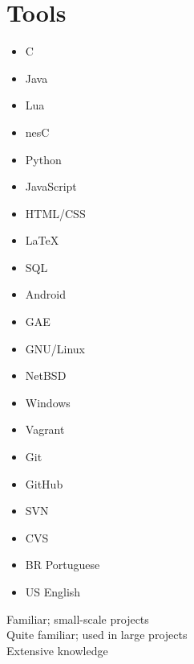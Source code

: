 \documentclass[a4paper,10pt]{article}
\begin{document}
\section{Tools}

\begin{multicols}{3}
  \begin{itemize}
    \renewcommand{\labelitemi}{\textcolor{lightg}{\symbol{"00BB}}}
    \setlength{\itemsep}{1pt}
    \setlength{\parskip}{0pt}
    \setlength{\parsep}{0pt}
  \item C \hfill \threenotes 
  \item Java \hfill \threenotes
  \item Lua \hfill \threenotes
  \item nesC \hfill \onenote
  \item Python \hfill \twonotes
  \item JavaScript \hfill \twonotes
  \item HTML/CSS \hfill \twonotes
  \item \LaTeX \hfill \twonotes
  \item SQL \hfill \twonotes
  \item Android \hfill \twonotes
  \item GAE \hfill \twonotes
  \item GNU/Linux \hfill \threenotes
  \item NetBSD \hfill \twonotes
  \item Windows \hfill \onenote
  \item Vagrant \hfill \twonotes
  \item Git \hfill \twonotes
  \item GitHub \hfill \twonotes
  \item SVN \hfill \onenote
  \item CVS \hfill \onenote
  \item BR Portuguese \hfill \twonotes
  \item US English \hfill \twonotes
  \end{itemize} 
\end{multicols}

\vspace{1em}

\begin{center}
\parbox[c]{8cm}{
  \onenote Familiar; small-scale projects \\
  \twonotes Quite familiar; used in large projects \\
  \threenotes Extensive knowledge
}
\end{center}
\end{document}
